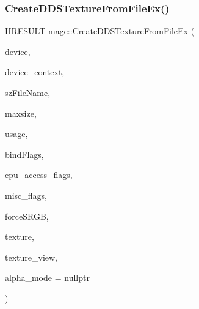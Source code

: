 \subsubsection{\texorpdfstring{Create\+D\+D\+S\+Texture\+From\+File\+Ex()}{CreateDDSTextureFromFileEx()}\hspace{0.1cm}{\footnotesize\ttfamily [2/4]}}
{\footnotesize\ttfamily H\+R\+E\+S\+U\+LT mage\+::\+Create\+D\+D\+S\+Texture\+From\+File\+Ex (\begin{DoxyParamCaption}\item[{\+\_\+\+In\+\_\+ I\+D3\+D11\+Device2 $\ast$}]{device,  }\item[{\+\_\+\+In\+\_\+opt\+\_\+ I\+D3\+D11\+Device\+Context $\ast$}]{device\+\_\+context,  }\item[{\+\_\+\+In\+\_\+z\+\_\+ const wchar\+\_\+t $\ast$}]{sz\+File\+Name,  }\item[{\+\_\+\+In\+\_\+ size\+\_\+t}]{maxsize,  }\item[{\+\_\+\+In\+\_\+ D3\+D11\+\_\+\+U\+S\+A\+GE}]{usage,  }\item[{\+\_\+\+In\+\_\+ uint32\+\_\+t}]{bind\+Flags,  }\item[{\+\_\+\+In\+\_\+ uint32\+\_\+t}]{cpu\+\_\+access\+\_\+flags,  }\item[{\+\_\+\+In\+\_\+ uint32\+\_\+t}]{misc\+\_\+flags,  }\item[{\+\_\+\+In\+\_\+ bool}]{force\+S\+R\+GB,  }\item[{\+\_\+\+Outptr\+\_\+opt\+\_\+ I\+D3\+D11\+Resource $\ast$$\ast$}]{texture,  }\item[{\+\_\+\+Outptr\+\_\+opt\+\_\+ I\+D3\+D11\+Shader\+Resource\+View $\ast$$\ast$}]{texture\+\_\+view,  }\item[{\+\_\+\+Out\+\_\+opt\+\_\+ \hyperlink{namespacemage_a0c586a2bad862f4858900ca121ca80c2}{D\+D\+S\+\_\+\+A\+L\+P\+H\+A\+\_\+\+M\+O\+DE} $\ast$}]{alpha\+\_\+mode = {\ttfamily nullptr} }\end{DoxyParamCaption})}

\hypertarget{namespacemage_aca15cd1804aa3b23b806a44c31019db8}{}\label{namespacemage_aca15cd1804aa3b23b806a44c31019db8} 
